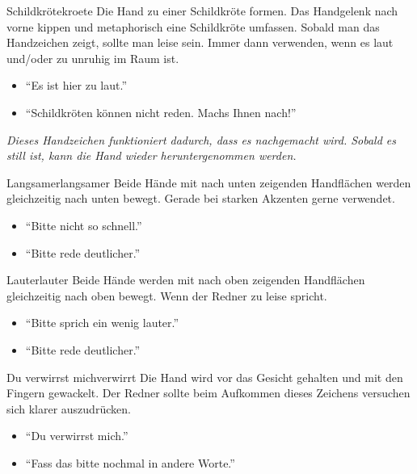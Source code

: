 \begin{handzeichen}[.2\linewidth]{Schildkröte}{kroete}
Die Hand zu einer Schildkröte formen. Das Handgelenk nach vorne kippen und metaphorisch eine Schildkröte umfassen. Sobald man das Handzeichen zeigt, sollte man leise sein.
Immer dann verwenden, wenn es laut und/oder zu unruhig im Raum ist.
\begin{itemize}
	\item \enquote{Es ist hier zu laut.}
	\item \enquote{Schildkröten können nicht reden. Machs Ihnen nach!}
\end{itemize}
\end{handzeichen}

\emph{
    Dieses Handzeichen funktioniert dadurch, dass es nachgemacht wird.
    Sobald es still ist, kann die Hand wieder heruntergenommen werden.
}

\begin{handzeichen}{Langsamer}{langsamer}
Beide Hände mit nach unten zeigenden Handflächen werden gleichzeitig nach unten bewegt. Gerade bei starken Akzenten gerne verwendet.
\begin{itemize}
	\item \enquote{Bitte nicht so schnell.}
	\item \enquote{Bitte rede deutlicher.}
\end{itemize}
\end{handzeichen}

\begin{handzeichen}{Lauter}{lauter}
Beide Hände werden mit nach oben zeigenden Handflächen gleichzeitig nach oben bewegt.
Wenn der Redner zu leise spricht.
\begin{itemize}
	\item \enquote{Bitte sprich ein wenig lauter.}
	\item \enquote{Bitte rede deutlicher.}
\end{itemize}
\end{handzeichen}

\begin{handzeichen}{Du verwirrst mich}{verwirrt}
Die Hand wird vor das Gesicht gehalten und mit den Fingern gewackelt. Der Redner sollte beim Aufkommen dieses Zeichens versuchen sich klarer auszudrücken.
\begin{itemize}
	\item \enquote{Du verwirrst mich.}
	\item \enquote{Fass das bitte nochmal in andere Worte.}
\end{itemize}
\end{handzeichen}


